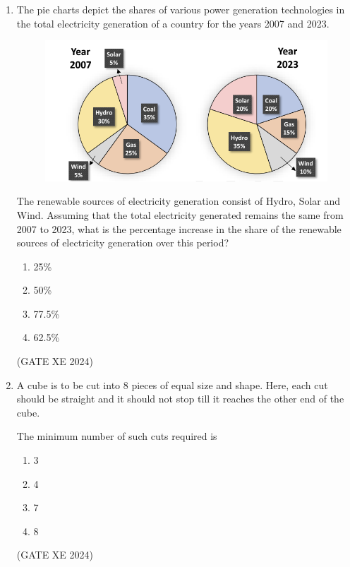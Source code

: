 \documentclass[12pt]{article}
\begin{document}
\begin{enumerate}
\begin{enumerate}
\item 1\% profit  
\item 2\% profit  
\item 1\% loss  
\item 2\% loss  
\end{enumerate}
(GATE XE 2024)

\item The pie charts depict the shares of various power generation technologies in the total electricity generation of a country for the years 2007 and 2023. 

\begin{figure}[H]
    \centering
    \includegraphics[width=0.5\columnwidth]{figs/ass5_0_q8.png}
    \caption{}
    \label{fig:placeholder}
\end{figure}

The renewable sources of electricity generation consist of Hydro, Solar and Wind. Assuming that the total electricity generated remains the same from 2007 to 2023, what is the percentage increase in the share of the renewable sources of electricity generation over this period?  

\begin{enumerate}
\item 25\%  
\item 50\%  
\item 77.5\%  
\item 62.5\%  
\end{enumerate}
(GATE XE 2024)

\item A cube is to be cut into 8 pieces of equal size and shape. Here, each cut should be straight and it should not stop till it reaches the other end of the cube.  

The minimum number of such cuts required is  

\begin{enumerate}
\item 3  
\item 4  
\item 7  
\item 8  
\end{enumerate}
(GATE XE 2024)


\end{enumerate}
\end{document}
